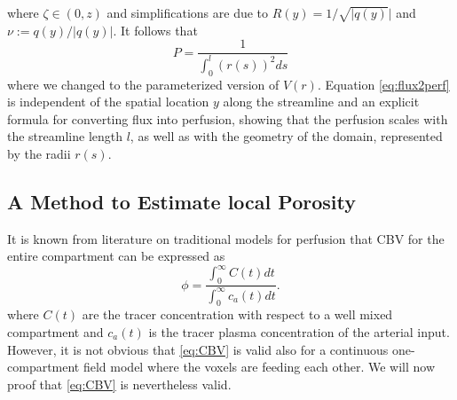 \documentclass[journal,twocolumn]{IEEEtran}
\begin{document}
	where $\zeta \in (0,z)$ and simplifications are due to $R(y) = 1/\sqrt{\vert q(y)} \vert$ and $\nu:=q(y)/\vert q(y) \vert$.
	It follows that
	\begin{equation}\label{eq:flux2perf}
		P= \frac{1}{\int_0^l (r(s))^2 ds}
	\end{equation}
	where we changed to the parameterized version of $V(r)$.
	Equation \eqref{eq:flux2perf} is independent of the spatial location $y$ along the streamline and an explicit formula for converting flux into perfusion, showing that the perfusion scales with the streamline length $l$, as well as with the geometry of the domain, represented by the radii $r(s)$.
	

	\subsection{A Method to Estimate local Porosity}\label{sec:CBV}
	
	It is known from literature on traditional models for perfusion that CBV for the entire compartment can be expressed as
	\begin{equation}
		\phi = \frac{\int_0^\infty C(t) dt}{\int_0^\infty c_a(t) dt}.
		\label{eq:CBV}
	\end{equation}
	where $C(t)$ are the tracer concentration with respect to a well mixed compartment and $c_a(t)$ is the tracer plasma concentration of the arterial input.
	However, it is not obvious that \eqref{eq:CBV} is valid also for a continuous one-compartment field model where the voxels are feeding each other. We will now proof that \eqref{eq:CBV} is nevertheless valid.
	
\end{document}
